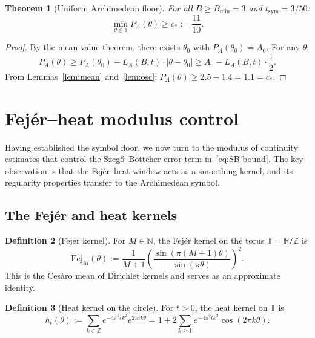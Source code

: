 \documentclass[11pt,a4paper]{article}
\newtheorem{theorem}{Theorem}[section]
\theoremstyle{definition}
\newtheorem{definition}[theorem]{Definition}
\theoremstyle{remark}
\newcommand{\R}{\mathbb{R}}
\newcommand{\Z}{\mathbb{Z}}
\newcommand{\T}{\mathbb{T}}
\newcommand{\N}{\mathbb{N}}
\begin{document}
\begin{theorem}[Uniform Archimedean floor]\label{lem:floor}
For all $B \geq B_{\min} = 3$ and $t_{\mathrm{sym}} = 3/50$:
\begin{equation}\label{eq:floor-main}
  \min_{\theta \in \T} P_A(\theta) \geq c_* := \frac{11}{10}.
\end{equation}
\end{theorem}

\begin{proof}
By the mean value theorem, there exists $\theta_0$ with $P_A(\theta_0) = A_0$. For any $\theta$:
\[
  P_A(\theta) \geq P_A(\theta_0) - L_A(B, t) \cdot |\theta - \theta_0|
              \geq A_0 - L_A(B, t) \cdot \frac{1}{2}.
\]
From Lemmas~\ref{lem:mean} and~\ref{lem:osc}: $P_A(\theta) \geq 2.5 - 1.4 = 1.1 = c_*$.
\end{proof}

\section{Fej\'er--heat modulus control}\label{sec:fejer-modulus}

Having established the symbol floor, we now turn to the modulus of continuity estimates that control the Szeg\H{o}--B\"ottcher error term in~\eqref{eq:SB-bound}. The key observation is that the Fej\'er--heat window acts as a smoothing kernel, and its regularity properties transfer to the Archimedean symbol.

\subsection{The Fej\'er and heat kernels}

\begin{definition}[Fej\'er kernel]
For $M \in \N$, the Fej\'er kernel on the torus $\T = \R/\Z$ is
\begin{equation}\label{eq:fejer-def}
  \mathrm{Fej}_M(\theta) := \frac{1}{M+1} \left( \frac{\sin(\pi(M+1)\theta)}{\sin(\pi\theta)} \right)^2.
\end{equation}
This is the Ces\`aro mean of Dirichlet kernels and serves as an approximate identity.
\end{definition}

\begin{definition}[Heat kernel on the circle]
For $t > 0$, the heat kernel on $\T$ is
\begin{equation}\label{eq:heat-circle-def}
  h_t(\theta) := \sum_{k \in \Z} e^{-4\pi^2 t k^2} e^{2\pi i k \theta} = 1 + 2\sum_{k \geq 1} e^{-4\pi^2 t k^2} \cos(2\pi k \theta).
\end{equation}
\end{definition}
\end{document}
